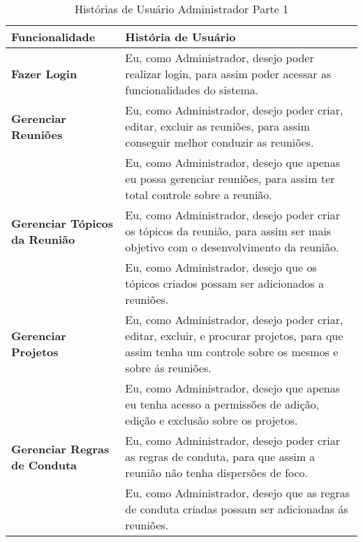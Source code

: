 \begin{table}[H]
	\begin{tabular}{|p{5.0cm}|p{10.0cm}|} 
	\hline
	\textbf{Funcionalidade} & \textbf{História de Usuário} \\ \hline
	\textbf{Fazer Login} & Eu, como Administrador, desejo poder realizar login, para assim poder acessar as funcionalidades do sistema.  \\ \hline
	\textbf{Gerenciar Reuniões} & Eu, como Administrador, desejo poder criar, editar, excluir as reuniões, para assim conseguir melhor conduzir as reuniões.\\ \hline
	& Eu, como Administrador, desejo que apenas eu possa gerenciar reuniões, para assim ter total controle sobre a reunião. \\ \hline
	\textbf{Gerenciar Tópicos da Reunião} & Eu, como Administrador, desejo poder criar os tópicos da reunião, para assim ser mais objetivo com o desenvolvimento da reunião. 
	\\ \hline
	& Eu, como Administrador, desejo que os tópicos criados possam ser adicionados a reuniões. \\ \hline
	\textbf{Gerenciar Projetos} & Eu, como Administrador, desejo poder criar, editar, excluir, e procurar projetos, para que assim tenha um controle sobre os mesmos e sobre ás reuniões. \\ \hline
	& Eu, como Administrador, desejo que apenas eu tenha acesso a permissões de adição, edição e exclusão sobre os projetos. \\ \hline
	\textbf{Gerenciar Regras de Conduta} & Eu, como Administrador, desejo poder criar as regras de conduta, para que assim a reunião não tenha dispersões de foco. \\ \hline
	& Eu, como Administrador, desejo que as regras de conduta criadas possam ser adicionadas ás reuniões. \\ \hline
	\end{tabular}
	 \caption{Histórias de Usuário Administrador Parte 1}
	 \label{tab:historias_de_usuario_administrador_parte1}
\end{table}

